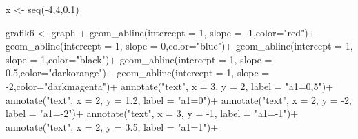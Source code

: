 \documentclass[
  letterpaper,
  DIV=11,
  numbers=noendperiod]{scrartcl}
\newenvironment{Shaded}{\begin{snugshade}}{\end{snugshade}}
\newcommand{\AttributeTok}[1]{\textcolor[rgb]{0.40,0.45,0.13}{#1}}
\newcommand{\DecValTok}[1]{\textcolor[rgb]{0.68,0.00,0.00}{#1}}
\newcommand{\FloatTok}[1]{\textcolor[rgb]{0.68,0.00,0.00}{#1}}
\newcommand{\FunctionTok}[1]{\textcolor[rgb]{0.28,0.35,0.67}{#1}}
\newcommand{\NormalTok}[1]{\textcolor[rgb]{0.00,0.23,0.31}{#1}}
\newcommand{\OtherTok}[1]{\textcolor[rgb]{0.00,0.23,0.31}{#1}}
\newcommand{\SpecialCharTok}[1]{\textcolor[rgb]{0.37,0.37,0.37}{#1}}
\newcommand{\StringTok}[1]{\textcolor[rgb]{0.13,0.47,0.30}{#1}}
\begin{document}
\begin{Shaded}
\begin{Highlighting}[]
\NormalTok{x }\OtherTok{\textless{}{-}} \FunctionTok{seq}\NormalTok{(}\SpecialCharTok{{-}}\DecValTok{4}\NormalTok{,}\DecValTok{4}\NormalTok{,}\FloatTok{0.1}\NormalTok{)}

\NormalTok{grafik6 }\OtherTok{\textless{}{-}}\NormalTok{ graph }\SpecialCharTok{+}
  \FunctionTok{geom\_abline}\NormalTok{(}\AttributeTok{intercept =} \DecValTok{1}\NormalTok{, }\AttributeTok{slope =} \SpecialCharTok{{-}}\DecValTok{1}\NormalTok{,}\AttributeTok{color=}\StringTok{"red"}\NormalTok{)}\SpecialCharTok{+}
  \FunctionTok{geom\_abline}\NormalTok{(}\AttributeTok{intercept =} \DecValTok{1}\NormalTok{, }\AttributeTok{slope =} \DecValTok{0}\NormalTok{,}\AttributeTok{color=}\StringTok{"blue"}\NormalTok{)}\SpecialCharTok{+}
  \FunctionTok{geom\_abline}\NormalTok{(}\AttributeTok{intercept =} \DecValTok{1}\NormalTok{, }\AttributeTok{slope =} \DecValTok{1}\NormalTok{,}\AttributeTok{color=}\StringTok{"black"}\NormalTok{)}\SpecialCharTok{+}
  \FunctionTok{geom\_abline}\NormalTok{(}\AttributeTok{intercept =} \DecValTok{1}\NormalTok{, }\AttributeTok{slope =} \FloatTok{0.5}\NormalTok{,}\AttributeTok{color=}\StringTok{"darkorange"}\NormalTok{)}\SpecialCharTok{+}
  \FunctionTok{geom\_abline}\NormalTok{(}\AttributeTok{intercept =} \DecValTok{1}\NormalTok{, }\AttributeTok{slope =} \SpecialCharTok{{-}}\DecValTok{2}\NormalTok{,}\AttributeTok{color=}\StringTok{"darkmagenta"}\NormalTok{)}\SpecialCharTok{+}
  \FunctionTok{annotate}\NormalTok{(}\StringTok{"text"}\NormalTok{, }\AttributeTok{x =} \DecValTok{3}\NormalTok{, }\AttributeTok{y =} \DecValTok{2}\NormalTok{, }\AttributeTok{label =} \StringTok{"a1=0,5"}\NormalTok{)}\SpecialCharTok{+}
  \FunctionTok{annotate}\NormalTok{(}\StringTok{"text"}\NormalTok{, }\AttributeTok{x =} \DecValTok{2}\NormalTok{, }\AttributeTok{y =} \FloatTok{1.2}\NormalTok{, }\AttributeTok{label =} \StringTok{"a1=0"}\NormalTok{)}\SpecialCharTok{+}
  \FunctionTok{annotate}\NormalTok{(}\StringTok{"text"}\NormalTok{, }\AttributeTok{x =} \DecValTok{2}\NormalTok{, }\AttributeTok{y =} \SpecialCharTok{{-}}\DecValTok{2}\NormalTok{, }\AttributeTok{label =} \StringTok{"a1={-}2"}\NormalTok{)}\SpecialCharTok{+}
  \FunctionTok{annotate}\NormalTok{(}\StringTok{"text"}\NormalTok{, }\AttributeTok{x =} \DecValTok{3}\NormalTok{, }\AttributeTok{y =} \SpecialCharTok{{-}}\DecValTok{1}\NormalTok{, }\AttributeTok{label =} \StringTok{"a1={-}1"}\NormalTok{)}\SpecialCharTok{+}
  \FunctionTok{annotate}\NormalTok{(}\StringTok{"text"}\NormalTok{, }\AttributeTok{x =} \DecValTok{2}\NormalTok{, }\AttributeTok{y =} \FloatTok{3.5}\NormalTok{, }\AttributeTok{label =} \StringTok{"a1=1"}\NormalTok{)}\SpecialCharTok{+}

\end{Highlighting}
\end{Shaded}
\end{document}
